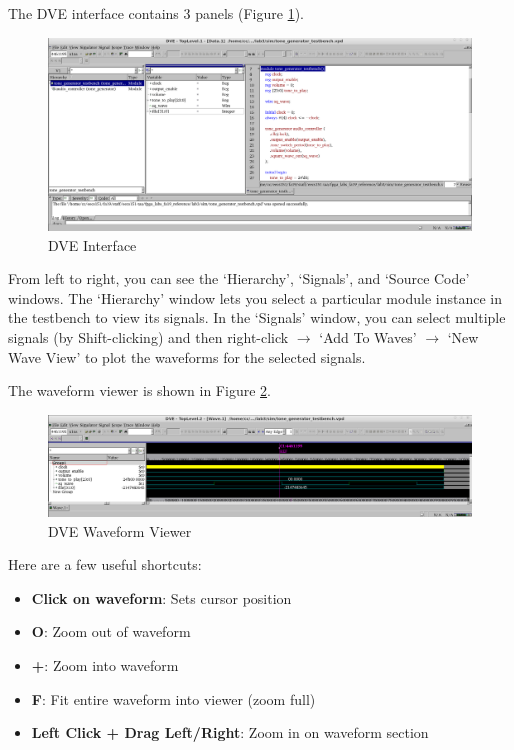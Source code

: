 \documentclass[11pt]{article}
\begin{document}
The DVE interface contains 3 panels (Figure \ref{fig:dve}).
\begin{figure}[h]
  \centering
  \includegraphics[width=\textwidth]{figs/dve.png}
  \caption{DVE Interface}
  \label{fig:dve}
\end{figure}

From left to right, you can see the `Hierarchy', `Signals', and `Source Code' windows.
The `Hierarchy' window lets you select a particular module instance in the testbench to view its signals.
In the `Signals' window, you can select multiple signals (by Shift-clicking) and then right-click $\rightarrow$ `Add To Waves' $\rightarrow$ `New Wave View' to plot the waveforms for the selected signals.

The waveform viewer is shown in Figure \ref{fig:dve_wave}.
\begin{figure}[h]
  \centering
  \includegraphics[width=\textwidth]{figs/dve_wave.png}
  \caption{DVE Waveform Viewer}
  \label{fig:dve_wave}
\end{figure}

Here are a few useful shortcuts:
\begin{itemize}
  \item \textbf{Click on waveform}: Sets cursor position
  \item \textbf{O}: Zoom out of waveform
  \item \textbf{+}: Zoom into waveform
  \item \textbf{F}: Fit entire waveform into viewer (zoom full)
  \item \textbf{Left Click + Drag Left/Right}: Zoom in on waveform section
\end{itemize}
\end{document}
